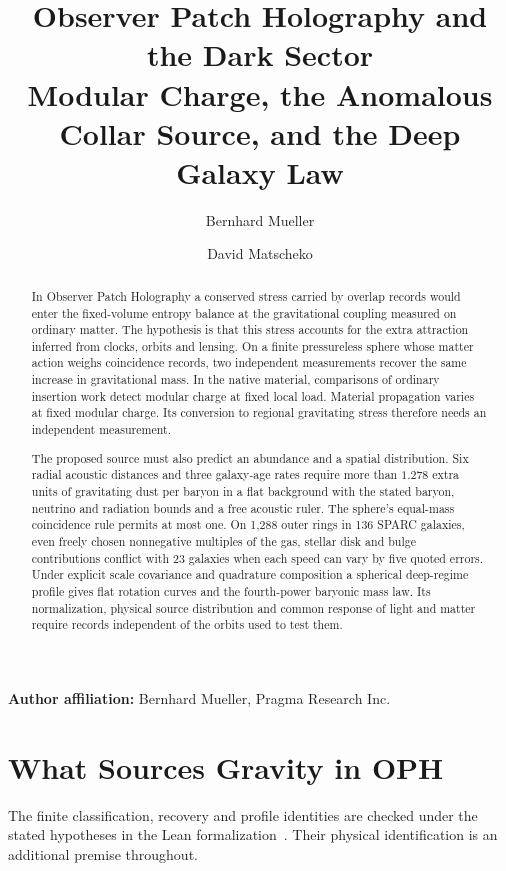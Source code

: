 \documentclass[11pt]{article}
\title{Observer Patch Holography and the Dark Sector\\
\large Modular Charge, the Anomalous Collar Source, and the Deep Galaxy Law}
\author{Bernhard Mueller \and David Matscheko}
\date{\OPHPaperReleaseDate}
\begin{document}
\maketitle
\OPHPaperReleaseBanner

\begin{center}
\small\textbf{Author affiliation:} Bernhard Mueller, Pragma Research Inc.
\end{center}

\begin{abstract}
In Observer Patch Holography a conserved stress carried by overlap
records would enter the fixed-volume entropy balance at the gravitational
coupling measured on ordinary matter. The hypothesis is that this
stress accounts for the extra attraction inferred from clocks, orbits
and lensing. On a finite pressureless sphere whose matter action weighs
coincidence records, two independent measurements recover the same
increase in gravitational mass. In the native material, comparisons of
ordinary insertion work detect modular charge at fixed local load.
Material propagation varies at fixed modular charge.
Its conversion to regional gravitating stress therefore needs an
independent measurement.

The proposed source must also predict an abundance and a spatial
distribution. Six radial acoustic distances and three galaxy-age rates
require more than $1.278$ extra units of gravitating dust per baryon in
a flat background with the stated baryon, neutrino and radiation bounds
and a free acoustic ruler. The sphere's equal-mass coincidence rule
permits at most one. On 1,288 outer rings in 136 SPARC galaxies,
even freely chosen nonnegative multiples of the gas, stellar disk
and bulge contributions conflict with 23 galaxies when each speed
can vary by five quoted errors. Under explicit scale covariance and
quadrature composition a spherical deep-regime profile gives flat
rotation curves and the fourth-power baryonic mass law. Its
normalization, physical source distribution and common response of light
and matter require records independent of the orbits used to test them.

\end{abstract}

\section{What Sources Gravity in OPH}

The finite classification, recovery and profile identities are checked under
the stated hypotheses in the Lean formalization~\cite{ophlean}. Their physical
identification is an additional premise throughout.
\end{document}
